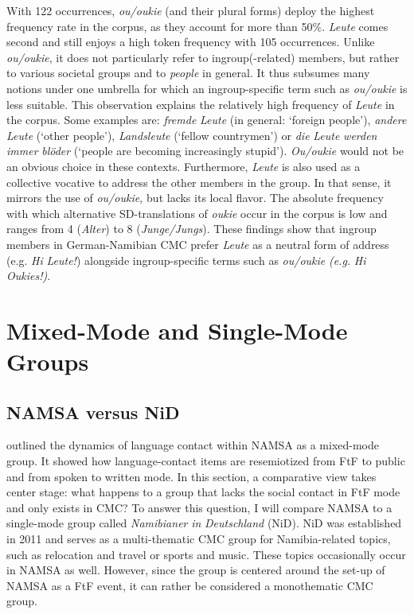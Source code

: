 \documentclass[output=paper]{langsci/langscibook}
\begin{document}
With 122 occurrences, \textit{ou/oukie} (and their plural forms) deploy the highest frequency rate in the corpus, as they account for more than 50\%. \textit{Leute} comes second and still enjoys a high token frequency with 105 occurrences. Unlike \textit{ou/oukie}, it does not particularly refer to ingroup(-related) members, but rather to various societal groups and to \textit{people} in general. It thus subsumes many notions under one umbrella for which an ingroup-specific term such as \textit{ou/oukie} is less suitable. This observation explains the relatively high frequency of \textit{Leute} in the corpus. Some examples are: \textit{fremde} \textit{Leute} (in general: ‘foreign people’), \textit{andere} \textit{Leute} (‘other people’), \textit{Landsleute} (‘fellow countrymen’) or \textit{die} \textit{Leute} \textit{werden} \textit{immer} \textit{blöder} (‘people are becoming increasingly stupid’). \textit{Ou/oukie} would not be an obvious choice in these contexts. Furthermore, \textit{Leute} is also used as a collective vocative to address the other members in the group. In that sense, it mirrors the use of \textit{ou/oukie,} but lacks its local flavor. The absolute frequency with which alternative SD-translations of \textit{oukie} occur in the corpus is low and ranges from 4 (\textit{Alter}) to 8 (\textit{Junge/Jungs}). These findings show that ingroup members in German-Namibian CMC prefer \textit{Leute} as a neutral form of address (e.g. \textit{Hi} \textit{Leute!}) alongside ingroup-specific terms such as \textit{ou/oukie} \textit{(e.g.} \textit{Hi} \textit{Oukies!)}.

 
 \section{Mixed-Mode and Single-Mode Groups}
\label{sec:radke:4}
 
  \subsection{NAMSA versus NiD}
  \label{sec:radke:4.1}
 

 outlined the dynamics of language contact within NAMSA as a mixed-mode group. It showed how language-contact items are resemiotized from FtF to public and from spoken to written mode. In this section, a comparative view takes center stage: what happens to a group that lacks the social contact in FtF mode and only exists in CMC? To answer this question, I will compare  NAMSA to a single-mode group called \textit{Namibianer} \textit{in} \textit{Deutschland} (NiD). NiD was established in 2011 and serves as a multi-thematic CMC group for Namibia-related topics, such as relocation and travel or sports and music. These topics occasionally occur in NAMSA as well. However, since the group is centered around the set-up of NAMSA as a FtF event, it can rather be considered a monothematic CMC group. 
\end{document}
